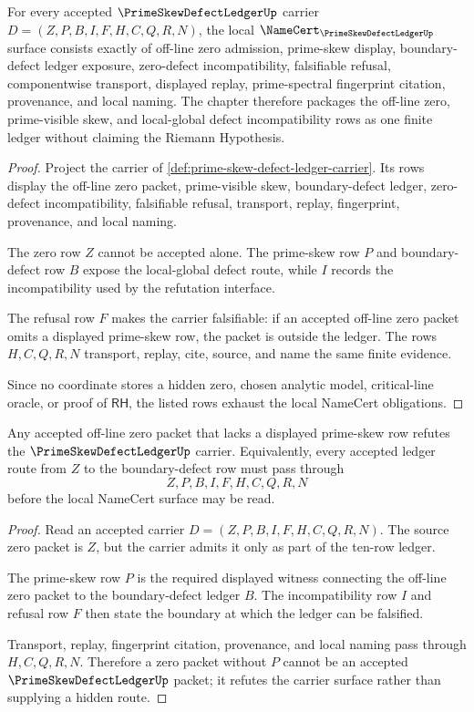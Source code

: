 \begin{theorem}
\label{thm:prime-skew-defect-ledger-namecert-obligations}
For every accepted $\PrimeSkewDefectLedgerUp$ carrier $D=(Z,P,B,I,F,H,C,Q,R,N)$, the local $\NameCert_{\PrimeSkewDefectLedgerUp}$ surface consists exactly of off-line zero admission, prime-skew display, boundary-defect ledger exposure, zero-defect incompatibility, falsifiable refusal, componentwise transport, displayed replay, prime-spectral fingerprint citation, provenance, and local naming. The chapter therefore packages the off-line zero, prime-visible skew, and local-global defect incompatibility rows as one finite ledger without claiming the Riemann Hypothesis.
\end{theorem}
\begin{proof}
Project the carrier of \autoref{def:prime-skew-defect-ledger-carrier}. Its rows display the off-line zero packet, prime-visible skew, boundary-defect ledger, zero-defect incompatibility, falsifiable refusal, transport, replay, fingerprint, provenance, and local naming.

The zero row $Z$ cannot be accepted alone. The prime-skew row $P$ and boundary-defect row $B$ expose the local-global defect route, while $I$ records the incompatibility used by the refutation interface.

The refusal row $F$ makes the carrier falsifiable: if an accepted off-line zero packet omits a displayed prime-skew row, the packet is outside the ledger. The rows $H,C,Q,R,N$ transport, replay, cite, source, and name the same finite evidence.

Since no coordinate stores a hidden zero, chosen analytic model, critical-line oracle, or proof of $\mathsf{RH}$, the listed rows exhaust the local NameCert obligations.
\end{proof}

\begin{theorem}
\label{thm:prime-skew-defect-ledger-falsifiable-boundary}
Any accepted off-line zero packet that lacks a displayed prime-skew row refutes the $\PrimeSkewDefectLedgerUp$ carrier. Equivalently, every accepted ledger route from $Z$ to the boundary-defect row must pass through
$$
Z,P,B,I,F,H,C,Q,R,N
$$
before the local NameCert surface may be read.
\end{theorem}
\begin{proof}
Read an accepted carrier $D=(Z,P,B,I,F,H,C,Q,R,N)$. The source zero packet is $Z$, but the carrier admits it only as part of the ten-row ledger.

The prime-skew row $P$ is the required displayed witness connecting the off-line zero packet to the boundary-defect ledger $B$. The incompatibility row $I$ and refusal row $F$ then state the boundary at which the ledger can be falsified.

Transport, replay, fingerprint citation, provenance, and local naming pass through $H,C,Q,R,N$. Therefore a zero packet without $P$ cannot be an accepted $\PrimeSkewDefectLedgerUp$ packet; it refutes the carrier surface rather than supplying a hidden route.
\end{proof}

